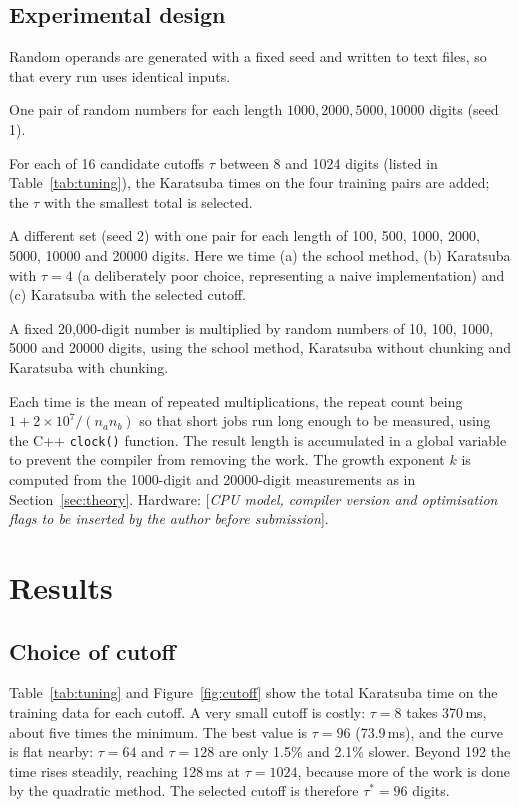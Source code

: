 \documentclass[11pt,a4paper]{article}
\begin{document}
\subsection{Experimental design}
Random operands are generated with a fixed seed and written to text files, so that every run uses identical inputs.
\begin{description}[nosep]
  \item[Training set.] One pair of random numbers for each length $1000, 2000, 5000, 10000$ digits (seed 1).
  \item[Cutoff search.] For each of 16 candidate cutoffs $\tau$ between 8 and 1024 digits (listed in Table~\ref{tab:tuning}), the Karatsuba times on the four training pairs are added; the $\tau$ with the smallest total is selected.
  \item[Testing set.] A different set (seed 2) with one pair for each length of 100, 500, 1000, 2000, 5000, 10000 and 20000 digits. Here we time (a) the school method, (b) Karatsuba with $\tau=4$ (a deliberately poor choice, representing a naive implementation) and (c) Karatsuba with the selected cutoff.
  \item[Unbalanced test.] A fixed 20{,}000-digit number is multiplied by random numbers of 10, 100, 1000, 5000 and 20000 digits, using the school method, Karatsuba without chunking and Karatsuba with chunking.
\end{description}
Each time is the mean of repeated multiplications, the repeat count being $1+2\times10^{7}/(n_an_b)$ so that short jobs run long enough to be measured, using the C++ \texttt{clock()} function. The result length is accumulated in a global variable to prevent the compiler from removing the work. The growth exponent $k$ is computed from the 1000-digit and 20000-digit measurements as in Section~\ref{sec:theory}. Hardware: [\emph{CPU model, compiler version and optimisation flags to be inserted by the author before submission}].

\section{Results}
\label{sec:results}

\subsection{Choice of cutoff}
Table~\ref{tab:tuning} and Figure~\ref{fig:cutoff} show the total Karatsuba time on the training data for each cutoff. A very small cutoff is costly: $\tau=8$ takes 370\,ms, about five times the minimum. The best value is $\tau=96$ (73.9\,ms), and the curve is flat nearby: $\tau=64$ and $\tau=128$ are only 1.5\% and 2.1\% slower. Beyond 192 the time rises steadily, reaching 128\,ms at $\tau=1024$, because more of the work is done by the quadratic method. The selected cutoff is therefore $\tau^\ast=96$ digits.
\end{document}
